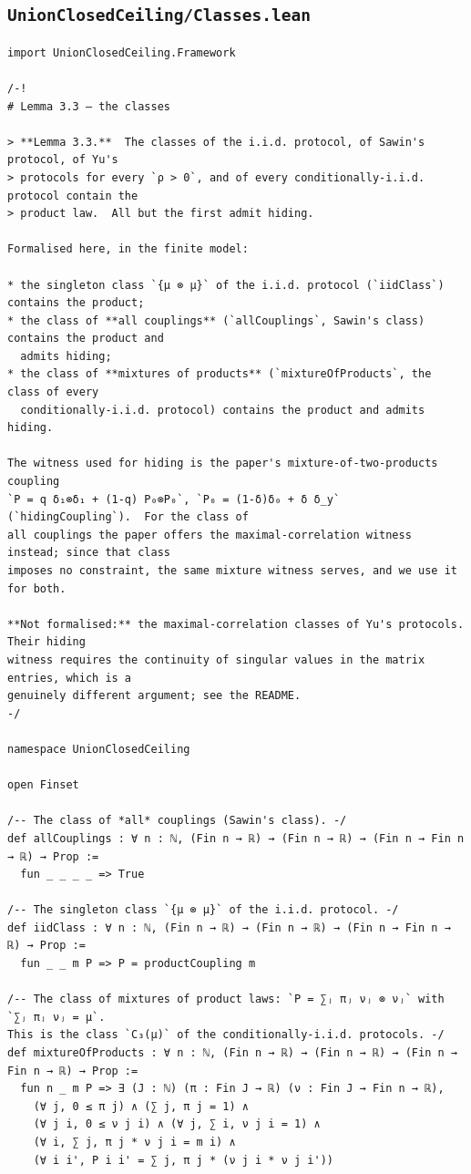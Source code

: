 \documentclass[11pt,a4paper]{article}
\theoremstyle{definition}
\theoremstyle{remark}
\begin{document}
\subsection{\texttt{UnionClosedCeiling/Classes.lean}}
\begin{Verbatim}[fontsize=\scriptsize,formatcom=\leanmono,samepage=false]
import UnionClosedCeiling.Framework

/-!
# Lemma 3.3 — the classes

> **Lemma 3.3.**  The classes of the i.i.d. protocol, of Sawin's protocol, of Yu's
> protocols for every `ρ > 0`, and of every conditionally-i.i.d. protocol contain the
> product law.  All but the first admit hiding.

Formalised here, in the finite model:

* the singleton class `{μ ⊗ μ}` of the i.i.d. protocol (`iidClass`) contains the product;
* the class of **all couplings** (`allCouplings`, Sawin's class) contains the product and
  admits hiding;
* the class of **mixtures of products** (`mixtureOfProducts`, the class of every
  conditionally-i.i.d. protocol) contains the product and admits hiding.

The witness used for hiding is the paper's mixture-of-two-products coupling
`P = q δ₁⊗δ₁ + (1-q) P₀⊗P₀`, `P₀ = (1-δ)δ₀ + δ δ_y` (`hidingCoupling`).  For the class of
all couplings the paper offers the maximal-correlation witness instead; since that class
imposes no constraint, the same mixture witness serves, and we use it for both.

**Not formalised:** the maximal-correlation classes of Yu's protocols.  Their hiding
witness requires the continuity of singular values in the matrix entries, which is a
genuinely different argument; see the README.
-/

namespace UnionClosedCeiling

open Finset

/-- The class of *all* couplings (Sawin's class). -/
def allCouplings : ∀ n : ℕ, (Fin n → ℝ) → (Fin n → ℝ) → (Fin n → Fin n → ℝ) → Prop :=
  fun _ _ _ _ => True

/-- The singleton class `{μ ⊗ μ}` of the i.i.d. protocol. -/
def iidClass : ∀ n : ℕ, (Fin n → ℝ) → (Fin n → ℝ) → (Fin n → Fin n → ℝ) → Prop :=
  fun _ _ m P => P = productCoupling m

/-- The class of mixtures of product laws: `P = ∑ⱼ πⱼ νⱼ ⊗ νⱼ` with `∑ⱼ πⱼ νⱼ = μ`.
This is the class `C₃(μ)` of the conditionally-i.i.d. protocols. -/
def mixtureOfProducts : ∀ n : ℕ, (Fin n → ℝ) → (Fin n → ℝ) → (Fin n → Fin n → ℝ) → Prop :=
  fun n _ m P => ∃ (J : ℕ) (π : Fin J → ℝ) (ν : Fin J → Fin n → ℝ),
    (∀ j, 0 ≤ π j) ∧ (∑ j, π j = 1) ∧
    (∀ j i, 0 ≤ ν j i) ∧ (∀ j, ∑ i, ν j i = 1) ∧
    (∀ i, ∑ j, π j * ν j i = m i) ∧
    (∀ i i', P i i' = ∑ j, π j * (ν j i * ν j i'))


\end{Verbatim}
\end{document}
